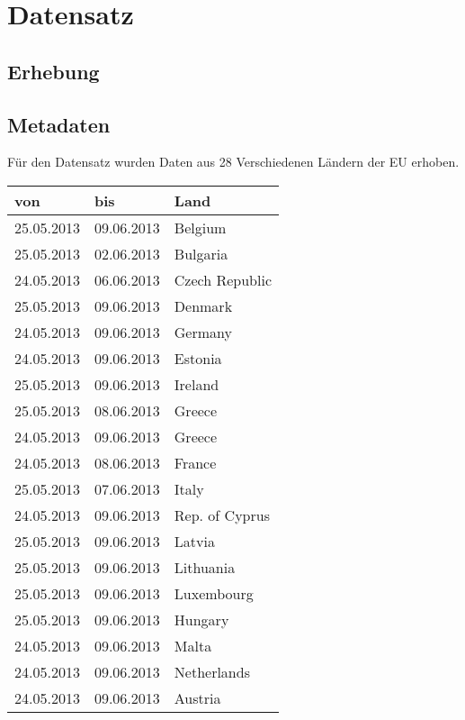 \section{Datensatz}

\subsection{Erhebung}

\subsection{Metadaten} %
\label{sub:Metadaten}

Für den Datensatz wurden Daten aus 28 Verschiedenen Ländern der EU erhoben.
\begin{floatingtable}[r] {
		\begin{tabular}{l | l | l}
			von & bis & Land \\ \hline
			25.05.2013 & 09.06.2013 & Belgium \\
			25.05.2013 & 02.06.2013 & Bulgaria \\
			24.05.2013 & 06.06.2013 & Czech Republic \\
			25.05.2013 & 09.06.2013 & Denmark \\
			24.05.2013 & 09.06.2013 & Germany \\
			24.05.2013 & 09.06.2013 & Estonia \\
			25.05.2013 & 09.06.2013 & Ireland \\
			25.05.2013 & 08.06.2013 & Greece \\
			24.05.2013 & 09.06.2013 & Greece \\
			24.05.2013 & 08.06.2013 & France \\
			25.05.2013 & 07.06.2013 & Italy \\
			24.05.2013 & 09.06.2013 & Rep. of Cyprus \\
			25.05.2013 & 09.06.2013 & Latvia \\
			25.05.2013 & 09.06.2013 & Lithuania \\
			25.05.2013 & 09.06.2013 & Luxembourg \\
			25.05.2013 & 09.06.2013 & Hungary \\
			24.05.2013 & 09.06.2013 & Malta \\
			24.05.2013 & 09.06.2013 & Netherlands \\
			24.05.2013 & 09.06.2013 & Austria \\

\end{tabular}}
\end{floatingtable}
